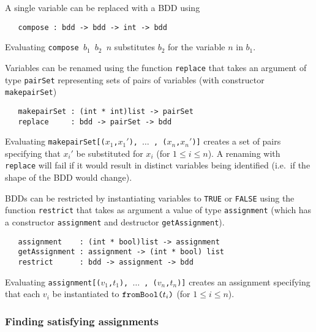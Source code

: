\documentclass[12pt]{book}
\renewcommand{\t}[1]{\mbox{\tt #1}}
\begin{document}
A single variable can be replaced with a BDD using

\begin{verbatim}
   compose : bdd -> bdd -> int -> bdd
\end{verbatim}

Evaluating \t{compose~$b_1$~$b_2$~$n$} substitutes $b_2$ for the
variable $n$ in $b_1$.

Variables can be renamed using the function \t{replace} that takes
an argument of type \t{pairSet} representing sets of pairs of variables
(with constructor \t{makepairSet})

\begin{verbatim}
   makepairSet : (int * int)list -> pairSet
   replace     : bdd -> pairSet -> bdd
\end{verbatim}

Evaluating \t{makepairSet[($x_1$,$x_1'$), $\ldots$ , ($x_n$,$x_n'$)]}
creates a set of pairs specifying that $x_i'$ be substituted for $x_i$
(for $1\leq i\leq n$).  A renaming with \t{replace} will fail if it
would result in distinct variables being identified (i.e.~if the shape of the BDD would change).

BDDs can be restricted by instantiating variables to {\t{TRUE}} or
{\t{FALSE}} using the function \t{restrict} that takes
as argument a value of type \t{assignment}
(which has a constructor \t{assignment} and destructor \t{getAssignment}).

\begin{verbatim}
   assignment    : (int * bool)list -> assignment
   getAssignment : assignment -> (int * bool) list
   restrict      : bdd -> assignment -> bdd
\end{verbatim}

Evaluating \t{assignment[($v_1$,$t_1$), $\ldots$ , ($v_n$,$t_n$)]}
creates an assignment specifying that each $v_i$ be instantiated to
$\t{fromBool(}t_i\t{)}$ (for $1{\leq}i{\leq}n$). 


\subsubsection{Finding satisfying assignments}
\end{document}
